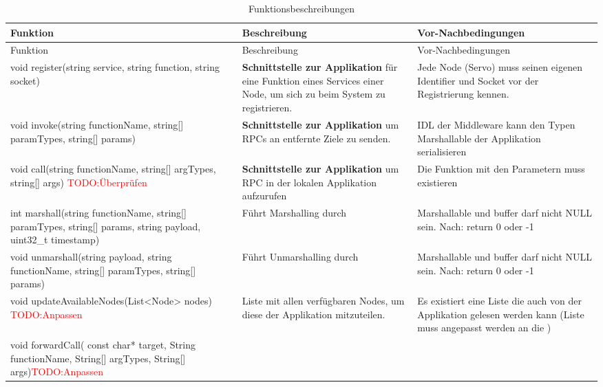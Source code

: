 \begin{longtable}{|>{\raggedright\arraybackslash}p{4cm}|>{\raggedright\arraybackslash}p{5cm}|>{\raggedright\arraybackslash}p{5cm}|}
	\caption{Funktionsbeschreibungen} \label{tab:loesungsstrategie} \\
	\hline
	Funktion & Beschreibung & Vor-Nachbedingungen \\
	\hline
	\endfirsthead
	
	\hline
	Funktion & Beschreibung & Vor-Nachbedingungen \\
	\hline
	\endhead
	
	\hline
	\endfoot
	
	
	void register(string service, string function, string socket) & 
	\textbf{Schnittstelle zur Applikation} für eine Funktion eines Services einer Node, um sich zu beim System zu registrieren. 
	& Jede Node (Servo) muss seinen eigenen Identifier und Socket vor der Registrierung kennen. 
	\\
	\hline
	void invoke(string functionName, string[] paramTypes, string[] params)
	& \textbf{Schnittstelle zur Applikation} um RPCs an entfernte Ziele zu senden. 
	& IDL der Middleware kann den Typen Marshallable der Applikation serialisieren
	\\
	\hline
	void call(string functionName, string[] argTypes, string[] args) \textcolor{red}{TODO:Überprüfen} 
	& \textbf{Schnittstelle zur Applikation} um RPC in der lokalen Applikation aufzurufen
	& Die Funktion mit den Parametern muss existieren
	\\
	int marshall(string functionName, string[] paramTypes, string[] params, string payload, uint32\_t timestamp)
	& Führt Marshalling durch
	& Marshallable und buffer darf nicht NULL sein. Nach: return 0 oder -1
	\\
	\hline
	void unmarshall(string payload, string functionName, string[] paramTypes, string[] params)
	& Führt Unmarshalling durch
	& Marshallable und buffer darf nicht NULL sein. Nach: return 0 oder -1
	\\
	\hline
	void updateAvailableNodes(List<Node> nodes) \textcolor{red}{TODO:Anpassen} 
	& Liste mit allen verfügbaren Nodes, um diese der Applikation mitzuteilen. 
	& Es existiert eine Liste die auch von der Applikation gelesen werden kann (Liste muss angepasst werden an die )
	\\
	\hline
	void forwardCall( const char* target, String functionName, String[] argTypes, String[] args)\textcolor{red}{TODO:Anpassen} 

\end{longtable}
